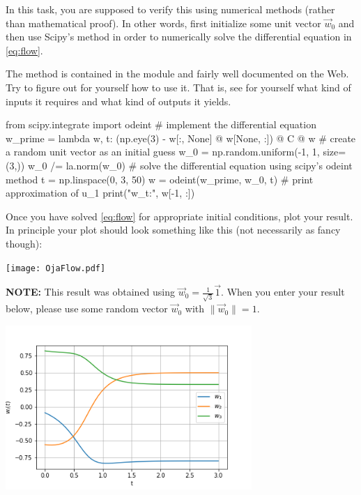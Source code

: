 In this task, you are supposed to verify this using numerical methods (rather than mathematical proof). In other words, first initialize some unit vector $\vec{w}_0$ and then use Scipy's  method in order to numerically solve the differential equation in \eqref{eq:flow}.

The method  is contained in the module  and fairly well documented on the Web. Try to figure out for yourself how to use it. That is, see for yourself what kind of inputs it requires and what kind of outputs it yields.

\begin{python}
from scipy.integrate import odeint
# implement the differential equation
w_prime = lambda w, t: (np.eye(3) - w[:, None] @ w[None, :]) @ C @ w
# create a random unit vector as an initial guess
w_0 = np.random.uniform(-1, 1, size=(3,))
w_0 /= la.norm(w_0)
# solve the differential equation using scipy's odeint method
t = np.linspace(0, 3, 50)
w = odeint(w_prime, w_0, t)
# print approximation of u_1
print("w_t:", w[-1, :])
\end{python}

Once you have solved \eqref{eq:flow} for appropriate initial conditions, plot your result. In principle your plot should look something like this (not necessarily as fancy though):
\begin{center}
\texttt{[image: OjaFlow.pdf]} 
\end{center}
\textbf{NOTE:} This result was obtained using $\vec{w}_0 = \frac{1}{\sqrt{3}} \vec{1}$. When you enter your result below, please use some random vector $\vec{w}_0$ with $\lVert \vec{w}_0 \rVert = 1$.
\begin{center}
\includegraphics[width=0.7\textwidth]{Ex_02/Figures/OjaFlow.png} 
\end{center}

